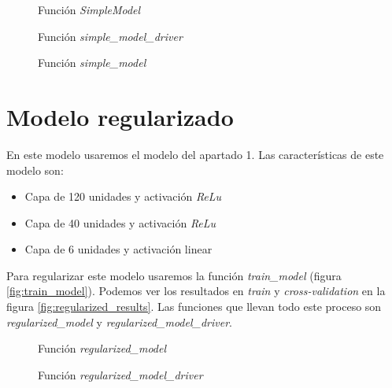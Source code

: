 \documentclass[6pt]{../../shared/AiTex}
\begin{document}
\begin{figure}[H]
    \centering
    
    \caption{Función \textit{SimpleModel}}
    \label{fig:SimpleModel}
\end{figure}

\begin{figure}[H]
    \centering
    
    \caption{Función \textit{simple\_model\_driver}}
    \label{fig:simple_model_driver}
\end{figure}

\begin{figure}[H]
    \centering
    
    \caption{Función \textit{simple\_model}}
    \label{fig:simple_model}
\end{figure}



\section{Modelo regularizado}

En este modelo usaremos el modelo del apartado 1. Las características de este modelo son:
\begin{itemize}
    \item Capa de 120 unidades y activación \textit{ReLu}
    \item Capa de 40 unidades y activación \textit{ReLu}
    \item Capa de 6 unidades y activación linear
\end{itemize}

Para regularizar este modelo usaremos la función \textit{train\_model} (figura \ref{fig:train_model}). Podemos ver los resultados en \textit{train} y \textit{cross-validation} en la figura \ref{fig:regularized_results}. Las funciones que llevan todo este proceso son \textit{regularized\_model} y \textit{regularized\_model\_driver}.


\begin{figure}[H]
    \centering
    
    \caption{Función \textit{regularized\_model}}
    \label{fig:regularized_model}
\end{figure}

\begin{figure}[H]
    \centering
    
    \caption{Función \textit{regularized\_model\_driver}}
    \label{fig:regularized_model_driver}
\end{figure}
\end{document}
